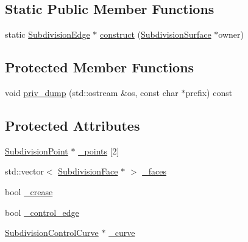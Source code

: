 \subsection*{Static Public Member Functions}
\begin{DoxyCompactItemize}
\item 
static \hyperlink{classShipCADGeometry_1_1SubdivisionEdge}{Subdivision\-Edge} $\ast$ \hyperlink{classShipCADGeometry_1_1SubdivisionEdge_ac2e94f4689d724a1d5b75c7f2619c37d}{construct} (\hyperlink{classShipCADGeometry_1_1SubdivisionSurface}{Subdivision\-Surface} $\ast$owner)
\end{DoxyCompactItemize}
\subsection*{Protected Member Functions}
\begin{DoxyCompactItemize}
\item 
void \hyperlink{classShipCADGeometry_1_1SubdivisionEdge_a8b33f4ae9edbd8ac4a386d9f5f5c1131}{priv\-\_\-dump} (std\-::ostream \&os, const char $\ast$prefix) const 
\end{DoxyCompactItemize}
\subsection*{Protected Attributes}
\begin{DoxyCompactItemize}
\item 
\hyperlink{classShipCADGeometry_1_1SubdivisionPoint}{Subdivision\-Point} $\ast$ \hyperlink{classShipCADGeometry_1_1SubdivisionEdge_a1df486b149723fe19190b178897f9a27}{\-\_\-points} \mbox{[}2\mbox{]}
\item 
std\-::vector$<$ \hyperlink{classShipCADGeometry_1_1SubdivisionFace}{Subdivision\-Face} $\ast$ $>$ \hyperlink{classShipCADGeometry_1_1SubdivisionEdge_af74c555a9f1e520c8a7092819182c565}{\-\_\-faces}
\item 
bool \hyperlink{classShipCADGeometry_1_1SubdivisionEdge_ae098b2abe43d484178e743a4e0ee2dd1}{\-\_\-crease}
\item 
bool \hyperlink{classShipCADGeometry_1_1SubdivisionEdge_a0253d92464fa44ece75199bafc2ab604}{\-\_\-control\-\_\-edge}
\item 
\hyperlink{classShipCADGeometry_1_1SubdivisionControlCurve}{Subdivision\-Control\-Curve} $\ast$ \hyperlink{classShipCADGeometry_1_1SubdivisionEdge_ae3d4de49a5c6b332d52a6c4e98704183}{\-\_\-curve}
\end{DoxyCompactItemize}
